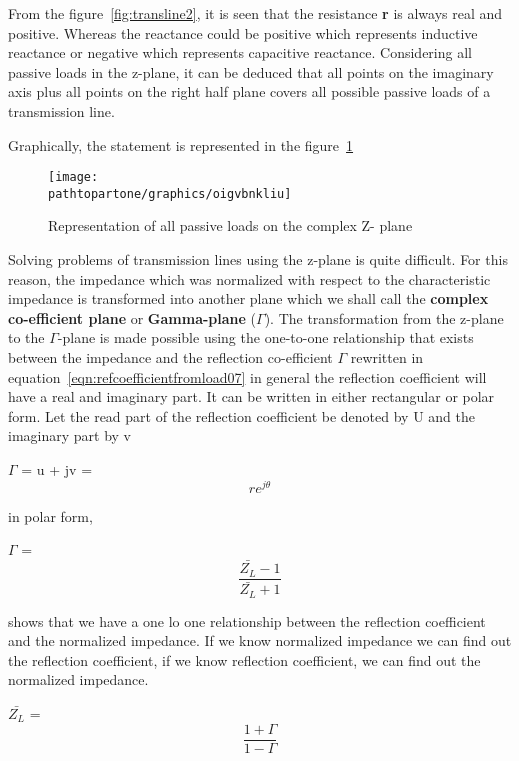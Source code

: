 From the figure~\ref{fig:transline2}, it is seen that the resistance \textbf{r} is always real and positive. Whereas the reactance could be positive which represents inductive reactance or negative which represents capacitive reactance. Considering all passive loads in the z-plane, it can be deduced that all points on the imaginary axis plus all points on the right half plane covers all possible passive loads of a transmission line.

Graphically, the statement is represented in the figure~\ref{fig:oigvbnkliu}
\begin{figure}[h]
\centering
\texttt{[image: \\pathtopartone/graphics/oigvbnkliu]}
\caption{Representation of all passive loads on the complex Z- plane}
\label{fig:oigvbnkliu}
\end{figure}

Solving problems of transmission lines using the z-plane is quite difficult. For this reason, the impedance which was normalized with respect to the characteristic impedance is transformed into another plane which we shall call the \textbf{complex co-efficient plane} or \textbf{Gamma-plane} ($\Gamma$).
The transformation from the z-plane to the $\Gamma$-plane is made possible using the one-to-one relationship that exists between the impedance and the reflection co-efficient $\Gamma$ rewritten in  equation~\eqref{eqn:refcoefficientfromload07}
in general the reflection coefficient will have a real and imaginary part. It can be written in either rectangular or polar form. Let the read part of the reflection coefficient be denoted by U and the imaginary part by v

$\Gamma$ = u + jv = \[ re^{j\theta} \] 

in polar form,  

$\Gamma$ = \[ \frac{\bar{Z_L} - 1}{\bar{Z_L} + 1} \] 

shows that we have a one lo one relationship between the reflection coefficient and the normalized impedance. If we know normalized impedance we can find out the reflection coefficient, if we know reflection coefficient, we can find out the normalized impedance.

$\bar{Z_L}$ = \[ \frac{1 + \Gamma}{1 - \Gamma} \] 

